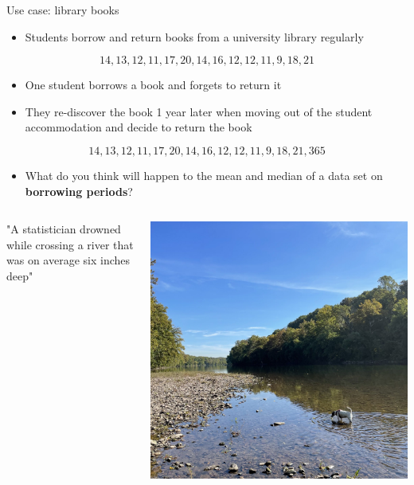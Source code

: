 \documentclass[
  ignorenonframetext,
  aspectratio=169]{beamer}
\providecommand{\tightlist}{%
  \setlength{\itemsep}{0pt}\setlength{\parskip}{0pt}}
\begin{document}
\begin{frame}{Use case: library books}
\protect\hypertarget{use-case-library-books}{}
\begin{itemize}
\tightlist
\item
  Students borrow and return books from a university library regularly
\end{itemize}

\[
14, 13, 12, 11, 17, 20, 14, 16, 12, 12, 11, 9, 18, 21
\]

\begin{itemize}
\tightlist
\item
  One student borrows a book and forgets to return it
\item
  They re-discover the book 1 year later when moving out of the student
  accommodation and decide to return the book
\end{itemize}

\[
14, 13, 12, 11, 17, 20, 14, 16, 12, 12, 11, 9, 18, 21, 365
\]

\begin{itemize}
\tightlist
\item
  What do you think will happen to the mean and median of a data set on
  \textbf{borrowing periods}?
\end{itemize}
\end{frame}

\begin{frame}{}
\protect\hypertarget{section-2}{}
\begin{columns}[T, onlytextwidth]

"A statistician drowned while crossing a river that was on average six inches deep"



\includegraphics[width=0.75\linewidth]{./images/river_crossing} 

\end{columns}
\end{frame}
\end{document}

